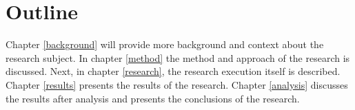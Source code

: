 \section{Outline}

Chapter \ref{background} will provide more background and context about the
research subject. In chapter \ref{method} the method and approach of the
research is discussed. Next, in chapter \ref{research}, the research execution
itself is described. Chapter \ref{results} presents the results of the research.
Chapter \ref{analysis} discusses the results after analysis and presents the
conclusions of the research.

\begin{comment}

INTRODUCTION

An introduction and overview of your thesis. Be sure to structure your thesis
such that you do not have to repeat yourself later. In this section you do not
cover details, but you give the reader an idea of the context, a brief overview
of the research, and how the remainder of the thesis is structured.

\end{comment}
\begin{comment}

MOTIVATION

This section describes in detail what problem the research is addressing, and
what the motivation is to address this problem.

There is a concise and objective statement of the research questions (or
hypotheses you are testing) and goals. It is made clear why these questions and
goals are important and relevant to the outside world (i.e., the field of
research or industry that you are addressing). You can already split the main
research question into sub questions in this chapter.

This section also describes an analysis of the problem: where does it occur and
how, how often, and what are the consequences?

An important part is also to scope to research: what aspects are included and
what aspects are deliberately left out, and why? An example introduction can be
found on Paul Klint’s
homepage\footnote{http://homepages.cwi.nl/~paulk/thesesMasterSoftwareEngineering/2006/ReinierLabee.pdf}.
\end{comment}
